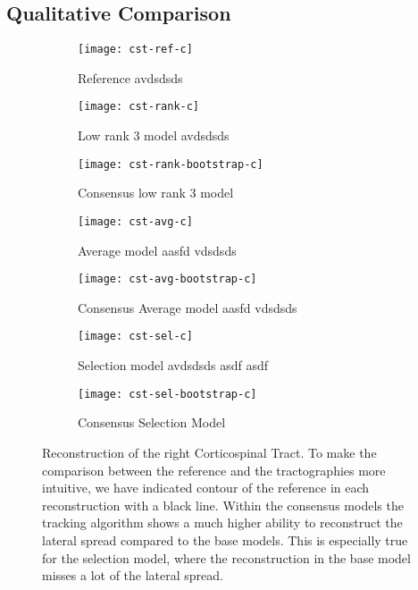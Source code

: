 \subsection{Qualitative Comparison}
\begin{figure*}[t]
	\centering
	\begin{minipage}{0.19\linewidth}
\begin{subfigure}[b]{\linewidth}
		\texttt{[image: cst-ref-c]}
		\caption{Reference {\color{white} avdsdsds} }
	\end{subfigure}
\end{minipage}
\hfil
	\begin{minipage}{0.19\linewidth}
		\begin{subfigure}[b]{\linewidth}
		\texttt{[image: cst-rank-c]}
		\caption{Low rank 3 model {\color{white} avdsdsds} }
	\end{subfigure}
	\begin{subfigure}[b]{\linewidth}
		\texttt{[image: cst-rank-bootstrap-c]}
		\caption{Consensus low rank 3 model}
\end{subfigure} 
	\end{minipage} \hfil
	\begin{minipage}{0.19\linewidth}
	\begin{subfigure}[b]{\linewidth}
		\texttt{[image: cst-avg-c]}
		\caption{Average model {\color{white} aasfd vdsdsds}}
	\end{subfigure}
	\begin{subfigure}[b]{\linewidth}
		\texttt{[image: cst-avg-bootstrap-c]}
		\caption{Consensus Average model{\color{white} aasfd vdsdsds}}
\end{subfigure} 
	\end{minipage} \hfil 
	\begin{minipage}{0.19\linewidth} 
	\begin{subfigure}[b]{\linewidth}
		\texttt{[image: cst-sel-c]}
		\caption{Selection model {\color{white} avdsdsds asdf asdf}}
	\end{subfigure}
	\begin{subfigure}[b]{\linewidth}
		\texttt{[image: cst-sel-bootstrap-c]}
		\caption{Consensus Selection Model}
\end{subfigure} 
	\end{minipage}
\caption{Reconstruction of the right Corticospinal Tract. To make the comparison
	between the reference and the tractographies more intuitive, we have
	indicated contour of the reference in each reconstruction with a black
	line. Within the consensus models the tracking algorithm shows a much higher ability
to reconstruct the lateral spread compared to the base models. This is
especially true for the selection model, where the reconstruction in the base
model misses a lot of the lateral spread.  }
	\label{fig:CST}
\end{figure*}
